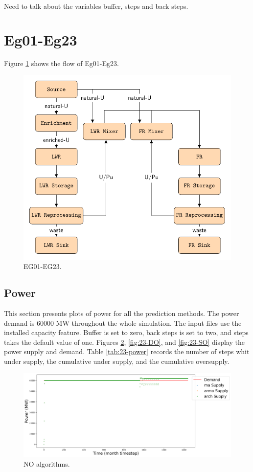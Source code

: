 \documentclass[11pt]{article}
\begin{document}
Need to talk about the variables buffer, steps and back steps.

\section{Eg01-Eg23}

Figure \ref{fig:23flow} shows the flow of Eg01-Eg23.

\begin{figure}[!h]
	\centering
	\includegraphics[width=\textwidth]{23-figures/23flow.pdf} 
	\hfill
	\caption{EG01-EG23.}
	\label{fig:23flow}
\end{figure}

\subsection{Power}

This section presents plots of power for all the prediction methods. The power demand is 60000 MW throughout the whole simulation. The input files use the installed capacity feature. Buffer is set to zero, back steps is set to two, and steps takes the default value of one.
Figures \ref{fig:23-NO}, \ref{fig:23-DO}, and \ref{fig:23-SO} display the power supply and demand.
Table \ref{tab:23-power} records the number of steps whit under supply, the cumulative under supply, and the cumulative oversupply.

\begin{figure}[!h]
	\centering
	\includegraphics[width=\textwidth]{23-figures/23-power-buffer01.png} 
	\hfill
	\caption{NO algorithms.}
	\label{fig:23-NO}
\end{figure}
\end{document}
